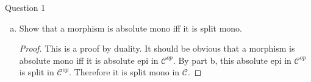\documentclass{article}
\DeclareMathOperator{\Id}{Id}
\DeclareMathOperator{\Hom}{Hom}
\newcommand{\catset}{{\bf Set}}
\newcommand{\cat}{\mathcal{C}}
\newenvironment{question}[1][]{\begin{paragraph}{Question #1}}{\end{paragraph}}
\theoremstyle{definition}
\begin{document}
\begin{question}[1]
\begin{enumerate}[(a)]
\begin{proof}
                  Suppose \(f:X\to Y\) is absolute epi, then \(\Hom(Y,f)\) must
                  be an epimorphism in \(\catset\), so
                  \(\Hom(Y,f):\Hom(Y,X)\to\Hom(Y,Y)\) is a surjective map. In
                  particular this means that there is a \(g\in\Hom(Y,X)\) such
                  that \(fg=\Id\) which is equivalent to being a split epi in
                  \(\cat\).
              \end{proof}

        \item Show that a morphism is absolute mono iff it is split mono.

              \begin{proof}
                  This is a proof by duality. It should be obvious that a
                  morphism is absolute mono iff it is absolute epi in
                  \(\cat^{op}\). By part b, this absolute epi in \(\cat^{op}\)
                  is split in \(\cat^{op}\). Therefore it is split mono in
                  \(\cat\).
              \end{proof}
    \end{enumerate}
\end{question}
\end{document}
